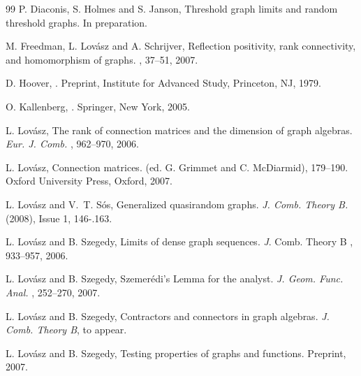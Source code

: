 \documentclass[11pt,reqno,tbtags]{amsart}
\numberwithin{equation}{section}
\theoremstyle{definition}
\theoremstyle{remark}
\renewcommand{\=}{:=}
\newcommand{\Lovasz}{Lov\'asz}
\begin{document}
\begin{thebibliography}{99}
P. Diaconis, S. Holmes  and S. Janson,
Threshold graph limits and random threshold graphs.
In preparation.

M. Freedman, L. \Lovasz{} and A. Schrijver,
Reflection positivity, rank connectivity, and homomorphism of graphs.
\JAMS {}, 37--51, 2007.

D. Hoover,
.
Preprint, Institute for Advanced Study, Princeton, NJ, 1979.

O. Kallenberg,
. 
Springer, New York, 2005.

L. \Lovasz, 
The rank of connection matrices and the dimension of graph algebras.
\emph{Eur. J. Comb.} , 962--970, 2006.

L. \Lovasz,
Connection matrices.  (ed. G. Grimmet and C. McDiarmid),
179--190. Oxford University Press, Oxford, 2007. 

L. \Lovasz{} and V.~T. S\'os,
Generalized quasirandom graphs.
\emph{J. Comb. Theory B.}
 (2008), Issue 1, 146-.163.

L. \Lovasz{} and B. Szegedy,
Limits of dense graph sequences.
{\emph J. Comb. Theory B} , 933--957, 2006.

L. \Lovasz{} and B. Szegedy,
Szemer\'edi's Lemma for the analyst.
\emph{J. Geom. Func. Anal.} , 252--270, 2007.

L. \Lovasz{} and B. Szegedy,
Contractors and connectors in graph algebras.
\emph{J. Comb. Theory B}, to appear.

L. \Lovasz{} and B. Szegedy,
Testing properties of graphs and functions.
Preprint, 2007.

\end{thebibliography}
\end{document}
